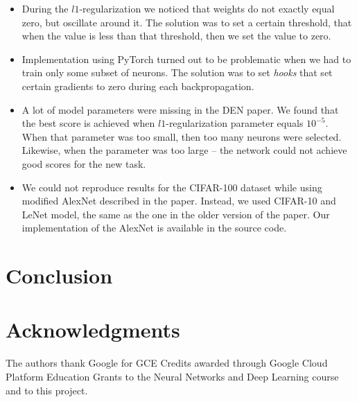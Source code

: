 \documentclass[12pt]{article}
\begin{document}
    \begin{itemize}
        \item During the $l1$-regularization we noticed that weights do not exactly equal zero, but
        oscillate around it. The solution was to set a certain threshold, that when the value is less than
        that threshold, then we set the value to zero.
        \item Implementation using PyTorch turned out to be problematic when we had to train only
        some subset of neurons. The solution was to set \textit{hooks} that set certain gradients to zero
        during each backpropagation.
        \item A lot of model parameters were missing in the DEN paper. We found that the best score is
        achieved when $l1$-regularization parameter equals $10^{-5}$. When that parameter was too small,
        then too many neurons were selected. Likewise, when the parameter was too large -- the network
        could not achieve good scores for the new task.
        \item We could not reproduce results for the CIFAR-100 dataset while using modified AlexNet described
        in the paper. Instead, we used CIFAR-10 and LeNet model, the same as the one in the older version
        of the paper. Our implementation of the AlexNet is available in the source code.
    \end{itemize}

    \section {Conclusion}
    

    \section{Acknowledgments}

    The authors thank Google for GCE Credits awarded through Google Cloud Platform Education Grants
    to the Neural Networks and Deep Learning course and to this project.    
        
\end{document}
